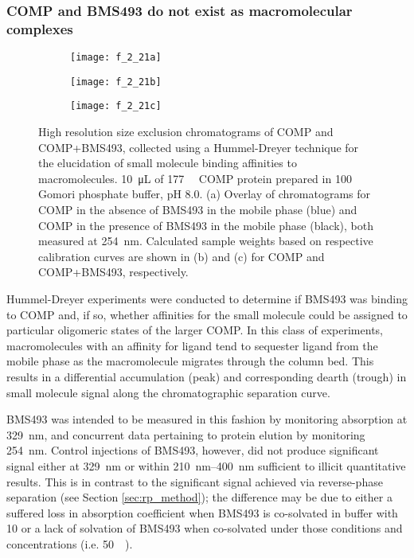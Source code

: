 \begin{refsection}
\subsubsection{COMP and BMS493 do not exist as macromolecular complexes}
\begin{figure}
    \centering
    \begin{subfigure}[b]{0.8\textwidth}
        \texttt{[image: f\_2\_21a]}
        \caption{}
    \end{subfigure}
    \begin{subfigure}[b]{0.4\textwidth}
        \texttt{[image: f\_2\_21b]}
        \caption{}
    \end{subfigure}
    \begin{subfigure}[b]{0.4\textwidth}
        \texttt{[image: f\_2\_21c]}
        \caption{}
    \end{subfigure}
    \caption{
    High resolution size exclusion chromatograms of COMP and COMP+BMS493,
    collected using a Hummel-Dreyer technique for the elucidation of small
    molecule binding affinities to macromolecules. \SI{10}{\uL} of
    \SI{177}{\micro\moLar} COMP protein prepared in \SI{100}{\milli\moLar}
    Gomori phosphate buffer, pH 8.0. (a) Overlay of chromatograms
    for COMP in the absence of BMS493 in the mobile phase (blue) and COMP in the
    presence of BMS493 in the mobile phase (black), both measured at
    \SI{254}{\nm}. Calculated sample weights based on respective calibration
    curves are shown in (b) and (c) for COMP and COMP+BMS493, respectively.
    }\label{fig:sec_results}
\end{figure}
Hummel-Dreyer experiments were conducted to determine if BMS493 was binding
to COMP and, if so, whether affinities for the small molecule could be assigned
to particular oligomeric states of the larger COMP. In this class of
experiments, macromolecules with an affinity for ligand tend to sequester ligand
from the mobile phase as the macromolecule migrates through the column bed. This
results in a differential accumulation (peak) and corresponding dearth (trough)
in small molecule signal along the chromatographic separation curve. 

BMS493 was intended to be measured in this fashion by monitoring absorption at
\SI{329}{\nm}, and concurrent data pertaining to protein elution by monitoring
\SI{254}{\nm}.  Control injections of BMS493, however, did not produce
significant signal either at \SI{329}{\nm} or within \SIrange{210}{400}{\nm}
sufficient to illicit quantitative results. This is in contrast to the
significant signal achieved via reverse-phase separation (see Section
\ref{sec:rp_method}); the difference may be due to either a suffered loss in
absorption coefficient when BMS493 is co-solvated in buffer with
\SI{10}{\volper} or a lack of solvation of BMS493 when co-solvated under those
conditions and concentrations (i.e.  \SI{50}{\micro\moLar}).


\end{refsection}

